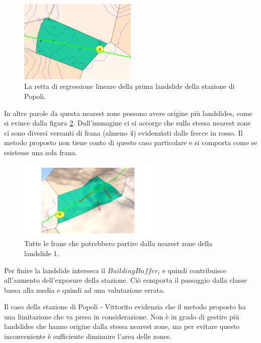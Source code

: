 	\begin{figure}[h]
	\centering
	\includegraphics[width=0.5\textwidth]{images/PopoliRect}
	\caption{La retta di regressione lineare della prima landslide della stazione di Popoli.}
	\label{popolirect}
\end{figure}


In altre parole da questa nearest zone possono avere origine più landslides, come si evince dalla figura \ref{popolimultilandslide}. Dall'immagine ci si accorge che sulla stessa nearest zone ci sono diversi versanti di frana (almeno 4) evidenziati dalle frecce in rosso. Il metodo proposto non tiene conto di questo caso particolare e si comporta come se esistesse una sola frana. 

\begin{figure}[h]
	\centering
	\includegraphics[width=0.6\textwidth]{images/PopoliMultiLandslide}
	\caption{Tutte le frane che potrebbero partire dalla nearest zone della landslide 1.}
	\label{popolimultilandslide}
\end{figure}

Per finire la landslide interseca il $BuildingBuffer_i$ e quindi contribuisce all'aumento dell'exposure della stazione. Ciò comporta il passaggio dalla classe bassa alla media e quindi ad una valutazione errata.

Il caso della stazione di Popoli - Vittorito evidenzia che il metodo proposto ha una limitazione che va presa in considerazione. Non è in grado di gestire più landslides che hanno origine dalla stessa nearest zone, ma per evitare questo inconveniente è sufficiente diminuire l'area delle zones.

